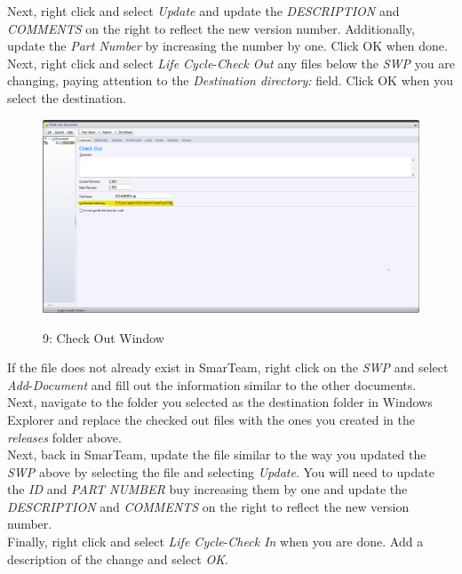 \documentclass[10pt]{article}
\begin{document}
                Next, right click and select \emph{Update} and update the \emph{DESCRIPTION} and \emph{COMMENTS} on the right to reflect the new version number. Additionally, update the \emph{Part Number} by increasing the number by one. Click OK when done. \\
                Next, right click and select \emph{Life Cycle}-\emph{Check Out} any files below the \emph{SWP} you are changing, paying attention to the \emph{Destination directory:} field. Click OK when you select the destination.
                \begin{figure}[H]
                    \centerline{\includegraphics[width=\textwidth]{References/ST Check Out Window.png}}
                    \figurename{ 9: Check Out Window}
                \end{figure}
                If the file does not already exist in SmarTeam, right click on the \emph{SWP} and select \emph{Add}-\emph{Document} and fill out the information similar to the other documents. \\
                Next, navigate to the folder you selected as the destination folder in Windows Explorer and replace the checked out files with the ones you created in the \emph{releases} folder above. \\
                Next, back in SmarTeam, update the file similar to the way you updated the \emph{SWP} above by selecting the file and selecting \emph{Update}. You will need to update the \emph{ID} and \emph{PART NUMBER} buy increasing them by one and update the \emph{DESCRIPTION} and \emph{COMMENTS} on the right to reflect the new version number. \\
                Finally, right click and select \emph{Life Cycle}-\emph{Check In} when you are done. Add a description of the change and select \emph{OK}.
\end{document}

